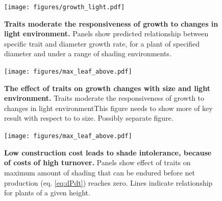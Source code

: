 \documentclass[12pt, a4paper]{article}
\begin{document}
\newpage

\begin{figure}[htbp]
\centering
\texttt{[image: figures/growth\_light.pdf]}
\caption{\textbf{Traits moderate the responsiveness of growth to changes
in light environment.} Panels show predicted relationship between
specific trait and diameter growth rate, for a plant of specified
diameter and under a range of shading environments.
\label{f-growth_light}}
\end{figure}

\newpage

\begin{figure}[htbp]
\centering
\texttt{[image: figures/max\_leaf\_above.pdf]}
\caption{\textbf{The effect of traits on growth changes with size and
light environment.} Traits moderate the responsiveness of growth to changes in light
environmentThis figure needs to show more of key result with respect to to size.
Possibly separate figure. \label{f-shifts}}
\end{figure}

\newpage

\begin{figure}[htbp]
\centering
\texttt{[image: figures/max\_leaf\_above.pdf]}
\caption{\textbf{Low construction cost leads to shade intolerance,
because of costs of high turnover.} Panels show effect of traits on
maximum amount of shading that can be endured before net production (eq.
\ref{eq:dPdt}) reaches zero. Lines indicate relationship for plants of a
given height. \label{f-wplcp}}
\end{figure}

\newpage


\end{document}
